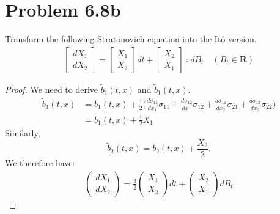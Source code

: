 \documentclass[11pt]{article}
\newcommand{\gs}{\sigma}
\begin{document}
\section*{Problem 6.8b}
Transform the following Stratonovich equation into the It\^o version.
\begin{align*}
\left[ \begin{array} { c } { d X _ { 1 } } \\ { d X _ { 2 } } \end{array} \right] = \left[ \begin{array} { c } { X _ { 1 } } \\ { X _ { 2 } } \end{array} \right] d t + \left[ \begin{array} { c } { X _ { 2 } } \\ { X _ { 1 } } \end{array} \right] \circ d B _ { t } \quad \left( B _ { t } \in \mathbf { R } \right)
\end{align*}
\begin{proof}
We need to derive $\tilde{b}_1(t,x)$ and $\tilde{b}_1(t,x)$.
\begin{align*}
\tilde{b}_1(t,x) &= b_1(t,x) + \frac{1}{2} \Big( \frac{d \gs_{11}}{d x_1} \gs_{11} +  \frac{d \gs_{12}}{d x_1} \gs_{12} + \frac{d \gs_{11}}{d x_2} \gs_{21}+ \frac{d \gs_{12}}{d x_2} \gs_{22} \Big)\\
&= b_1(t,x) + \frac{1}{2} X_1
\end{align*} 
Similarly, $$\tilde{b}_2(t,x)  = b_2(t,x) +\frac{X_2}{2}.$$  We therefore have:
\begin{align*}
\begin{pmatrix}
dX_1 \\ dX_2
\end{pmatrix} = \frac{3}{2}\begin{pmatrix}
X_1 \\ X_2 \end{pmatrix}dt + \begin{pmatrix}
X_2 \\ X_1 \end{pmatrix} dB_t
\end{align*}
\end{proof}
\end{document}
